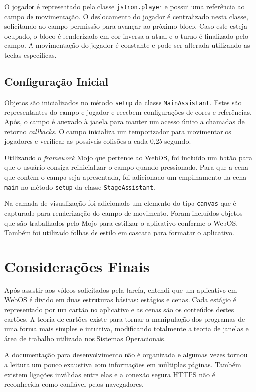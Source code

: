 \documentclass{article}
\begin{document}
O jogador é representado pela classe \texttt{jstron.player} e possui uma
referência ao campo de movimentação. O deslocamento do jogador é centralizado
nesta classe, solicitando ao campo permissão para avançar ao próximo bloco. Caso
este esteja ocupado, o bloco é renderizado em cor inversa a atual e o turno é
finalizado pelo campo. A movimentação do jogador é constante e pode ser alterada
utilizando as teclas específicas.

\subsection{Configuração Inicial}

Objetos são inicializados no método \texttt{setup} da classe
\texttt{MainAssistant}. Estes são representantes do campo e jogador e recebem
configurações de cores e referências. Após, o campo é anexado à janela para
manter um acesso único a chamadas de retorno \emph{callbacks}. O campo
inicializa um temporizador para movimentar os jogadores e verificar as possíveis
colisões a cada 0,25 segundo.

Utilizando o \emph{framework} Mojo que pertence ao WebOS, foi incluído um botão
para que o usuário consiga reinicializar o campo quando pressionado. Para que a
cena que contém o campo seja apresentada, foi adicionado um empilhamento da cena
\texttt{main} no método \texttt{setup} da classe \texttt{StageAssistant}.

Na camada de visualização foi adicionado um elemento do tipo \texttt{canvas} que
é capturado para renderização do campo de movimento. Foram incluídos objetos que
são trabalhados pelo Mojo para estilizar o aplicativo conforme o WebOS. Também
foi utilizado folhas de estilo em cascata para formatar o aplicativo.

\section{Considerações Finais}
\label{sec:consideracoes}

Após assistir aos vídeos solicitados pela tarefa, entendi que um aplicativo em
WebOS é divido em duas estruturas básicas: estágios e cenas. Cada estágio é
representado por um cartão no aplicativo e as cenas são os conteúdos destes
cartões. A teoria de cartões existe para tornar a manipulação dos programas de
uma forma mais simples e intuitiva, modificando totalmente a teoria de janelas e
área de trabalho utilizada nos Sistemas Operacionais.

A documentação para desenvolvimento não é organizada e algumas vezes tornou a
leitura um pouco exaustiva com informações em múltiplas páginas. Também existem
ligações inválidas entre elas e a conexão segura HTTPS não é reconhecida como
confiável pelos navegadores.
\end{document}
